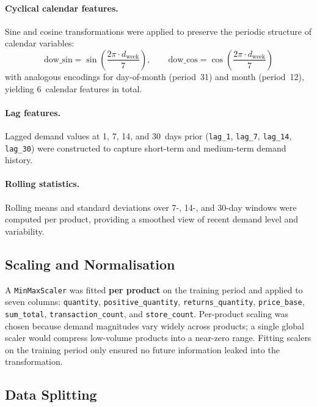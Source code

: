 \documentclass[12pt, a4paper]{article}
\begin{document}
\paragraph{Cyclical calendar features.}
Sine and cosine transformations were applied to preserve the periodic structure of
calendar variables:
\begin{equation}
    \text{dow\_sin} = \sin\!\left(\frac{2\pi \cdot d_{\text{week}}}{7}\right), \qquad
    \text{dow\_cos} = \cos\!\left(\frac{2\pi \cdot d_{\text{week}}}{7}\right)
    \label{eq:calendar}
\end{equation}
with analogous encodings for day-of-month (period~31) and month (period~12), yielding
6~calendar features in total.

\paragraph{Lag features.}
Lagged demand values at 1, 7, 14, and 30~days prior (\texttt{lag\_1},
\texttt{lag\_7}, \texttt{lag\_14}, \texttt{lag\_30}) were constructed to capture
short-term and medium-term demand history.

\paragraph{Rolling statistics.}
Rolling means and standard deviations over 7-, 14-, and 30-day windows were computed
per product, providing a smoothed view of recent demand level and variability.

\subsection{Scaling and Normalisation}
\label{subsec:scaling}

A \texttt{MinMaxScaler} was fitted \textbf{per product} on the training period and
applied to seven columns: \texttt{quantity}, \texttt{positive\_quantity},
\texttt{returns\_quantity}, \texttt{price\_base}, \texttt{sum\_total},
\texttt{transaction\_count}, and \texttt{store\_count}. Per-product scaling was chosen
because demand magnitudes vary widely across products; a single global scaler would
compress low-volume products into a near-zero range. Fitting scalers on the training
period only ensured no future information leaked into the transformation.

\subsection{Data Splitting}
\label{subsec:splits}
\end{document}
